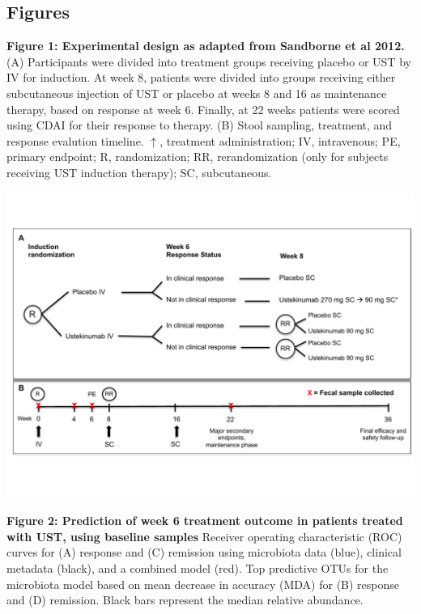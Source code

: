 \documentclass[12pt,]{article}
\begin{document}
\newpage

\subsection{Figures}\label{figures}

\textbf{Figure 1: Experimental design as adapted from Sandborne et al
2012.} (A) Participants were divided into treatment groups receiving
placebo or UST by IV for induction. At week 8, patients were divided
into groups receiving either subcutaneous injection of UST or placebo at
weeks 8 and 16 as maintenance therapy, based on response at week 6.
Finally, at 22 weeks patients were scored using CDAI for their response
to therapy. (B) Stool sampling, treatment, and response evalution
timeline. \(\uparrow\), treatment administration; IV, intravenous; PE,
primary endpoint; R, randomization; RR, rerandomization (only for
subjects receiving UST induction therapy); SC, subcutaneous.

\includegraphics{figures/Figure1_expdesign.pdf}

\newpage

\textbf{Figure 2: Prediction of week 6 treatment outcome in patients
treated with UST, using baseline samples} Receiver operating
characteristic (ROC) curves for (A) response and (C) remission using
microbiota data (blue), clinical metadata (black), and a combined model
(red). Top predictive OTUs for the microbiota model based on mean
decrease in accuracy (MDA) for (B) response and (D) remission. Black
bars represent the median relative abundance.
\end{document}
